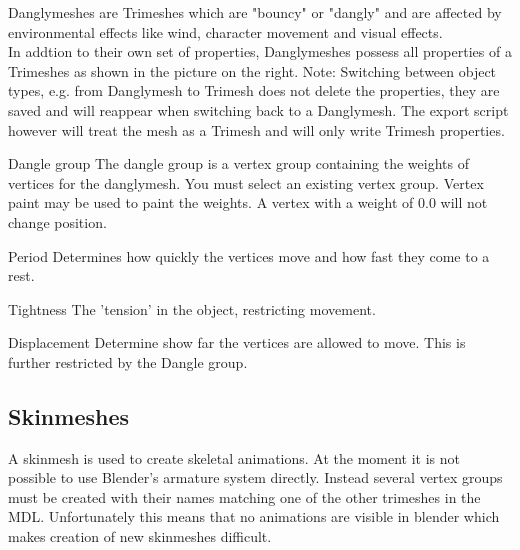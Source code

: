 \begin{minipage}[t]{0.65\textwidth}
    Danglymeshes are Trimeshes which are "bouncy" or "dangly" and are affected by environmental 
    effects like wind, character movement and visual effects.\\
    
    In addtion to their own set of properties, Danglymeshes possess all properties of a Trimeshes 
    as shown in the picture on the right. Note: Switching between object types, e.g. from 
    Danglymesh to Trimesh does not delete the properties, they are saved and will reappear when 
    switching back to a Danglymesh. The export script however will treat the mesh as a Trimesh and 
    will only write Trimesh properties.
\end{minipage}\hfill
\begin{minipage}[t]{0.3\textwidth}
    \centering{}
    \label{fig1}
\end{minipage}

\begin{propertyAurora}{Dangle group} 
The dangle group is a vertex group containing the weights of vertices for the danglymesh. 
You must select an existing vertex group. Vertex paint may be used to paint the weights. A vertex with a weight of
0.0 will not change position.
\end{propertyAurora}

\begin{propertyAurora}{Period} 
Determines how quickly the vertices move and how fast they come to a rest.
\end{propertyAurora}
\begin{propertyAurora}{Tightness} 
The 'tension' in the object, restricting movement. 
\end{propertyAurora}
\begin{propertyAurora}{Displacement} 
Determine show far the vertices are allowed to move. This is further restricted by the Dangle group.
\end{propertyAurora}


\subsection{Skinmeshes}
A skinmesh is used to create skeletal animations. At the moment it is not 
possible to use Blender's armature system directly. Instead several vertex groups 
must be created with their names matching one of the other trimeshes in the MDL. 
Unfortunately this means that no animations are visible in blender which makes
creation of new skinmeshes difficult.


